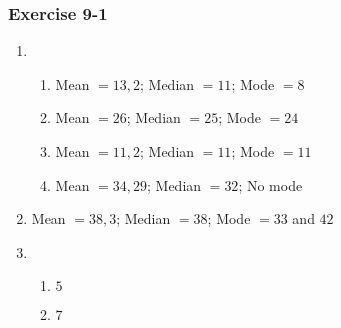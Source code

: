 {\begin{multicols}{3}
\subsubsection*{Exercise 9-1} %
\begin{enumerate}[noitemsep, label=\textbf{\arabic*}.]
\item %
\begin{enumerate}[noitemsep, label=\textbf{(\alph*)} ]
 \item Mean $= 13,2$; Median $= 11$; Mode $= 8$ %
\item Mean $= 26$; Median $= 25$; Mode $= 24$%
\item Mean $=11,2$; Median $= 11$; Mode $=11$%
\item Mean $=34,29$; Median $=32$; No mode%
\end{enumerate}
\item Mean $=38,3$; Median $= 38$; Mode $= 33$ and $42$%
\item %
\begin{enumerate}[noitemsep, label=\textbf{(\alph*)} ]
  \item $5$%
  \item $7$%
  \end{enumerate}




\end{enumerate}
\end{multicols}}
